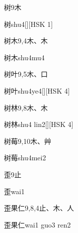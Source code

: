 \begin{entry}{树}{9}{⽊}
  \begin{phonetics}{树}{shu4}[][HSK 1]
  \end{phonetics}
\end{entry}

\begin{entry}{树木}{9,4}{⽊、⽊}
  \begin{phonetics}{树木}{shu4mu4}
  \end{phonetics}
\end{entry}

\begin{entry}{树叶}{9,5}{⽊、⼝}
  \begin{phonetics}{树叶}{shu4ye4}[][HSK 4]
  \end{phonetics}
\end{entry}

\begin{entry}{树林}{9,8}{⽊、⽊}
  \begin{phonetics}{树林}{shu4 lin2}[][HSK 4]
  \end{phonetics}
\end{entry}

\begin{entry}{树莓}{9,10}{⽊、⾋}
  \begin{phonetics}{树莓}{shu4mei2}
  \end{phonetics}
\end{entry}

\begin{entry}{歪}{9}{⽌}
  \begin{phonetics}{歪}{wai1}
  \end{phonetics}
\end{entry}

\begin{entry}{歪果仁}{9,8,4}{⽌、⽊、⼈}
  \begin{phonetics}{歪果仁}{wai1 guo3 ren2}
  \end{phonetics}
\end{entry}

